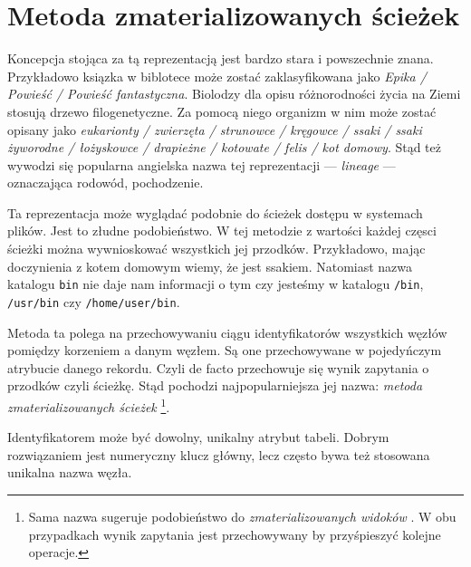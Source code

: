 \section{Metoda zmaterializowanych ścieżek}


Koncepcja stojąca za tą reprezentacją jest bardzo stara i powszechnie znana.
Przykładowo ksiązka w biblotece może zostać zaklasyfikowana jako \textit{Epika / Powieść / Powieść fantastyczna}.
Biolodzy dla opisu różnorodności życia na Ziemi stosują drzewo filogenetyczne.
Za pomocą niego organizm w nim może zostać opisany jako
\textit{eukarionty / zwierzęta / strunowce / kręgowce / ssaki / ssaki żyworodne / łożyskowce / drapieżne / kotowate / felis / kot domowy}.
Stąd też wywodzi się popularna angielska nazwa tej reprezentacji --- \textit{lineage} --- oznaczająca rodowód, pochodzenie.


    Ta reprezentacja może wyglądać podobnie do ścieżek dostępu w systemach plików.
    Jest to złudne podobieństwo.
    W tej metodzie z wartości każdej częsci ścieżki można wywnioskować wszystkich jej przodków.
    Przykładowo, mając doczynienia z kotem domowym wiemy, że jest ssakiem.
    Natomiast nazwa katalogu \texttt{bin} nie daje nam informacji o tym czy jesteśmy w katalogu \texttt{/bin}, \texttt{/usr/bin} czy \texttt{/home/user/bin}.



Metoda ta polega na przechowywaniu ciągu identyfikatorów wszystkich węzłów pomiędzy korzeniem a danym węzłem.
Są one przechowywane w pojedyńczym atrybucie danego rekordu.
Czyli de facto przechowuje się wynik zapytania o przodków czyli ścieżkę.
Stąd pochodzi najpopularniejsza jej nazwa: \emph{metoda zmaterializowanych ścieżek} \footnote{
    Sama nazwa sugeruje podobieństwo do \emph{zmaterializowanych widoków} .
    W obu przypadkach wynik zapytania jest przechowywany by przyśpieszyć kolejne operacje.
}.


Identyfikatorem może być dowolny, unikalny atrybut  tabeli.
Dobrym rozwiązaniem jest numeryczny klucz główny, lecz często bywa też stosowana unikalna nazwa węzła.


